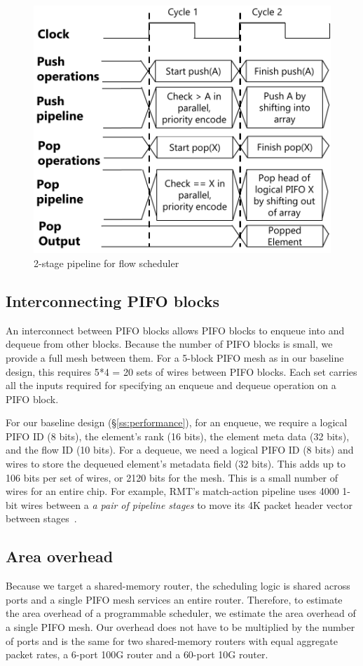 \begin{figure}[!t]
  \centering
  \includegraphics[width=0.6\columnwidth]{pifo_2stage_pipeline.pdf}
  \caption{2-stage pipeline for flow scheduler}
  \label{fig:2stage}
\end{figure}

\subsection{Interconnecting PIFO blocks}
\label{ss:interconnect}

An interconnect between PIFO blocks allows PIFO blocks to enqueue into and
dequeue from other blocks. Because the number of PIFO blocks is small, we
provide a full mesh between them. For a 5-block PIFO mesh as in our baseline
design, this requires 5*4 = 20 sets of wires between PIFO blocks. Each set
carries all the inputs required for specifying an enqueue and dequeue operation
on a PIFO block.

For our baseline design (\S\ref{ss:performance}), for an enqueue, we require a
logical PIFO ID (8 bits), the element's rank (16 bits), the element meta data
(32 bits), and the flow ID (10 bits). For a dequeue, we need a logical PIFO ID
(8 bits) and wires to store the dequeued element's metadata field (32 bits).
This adds up to 106 bits per set of wires, or 2120 bits for the mesh. This is a
small number of wires for an entire chip.  For example, RMT's match-action pipeline
uses 4000 1-bit wires between a {\em a pair of pipeline stages} to move its 4K
packet header vector between stages~\cite{rmt}. 

\subsection{Area overhead}
\label{ss:feasibility}

Because we target a shared-memory router, the scheduling logic is shared
across ports and a single PIFO mesh services an entire router. Therefore, to
estimate the area overhead of a programmable scheduler, we estimate the area
overhead of a single PIFO mesh. Our overhead does not have to be multiplied by
the number of ports and is the same for two shared-memory routers with equal
aggregate packet rates, \eg a 6-port 100G router and a 60-port 10G router.

